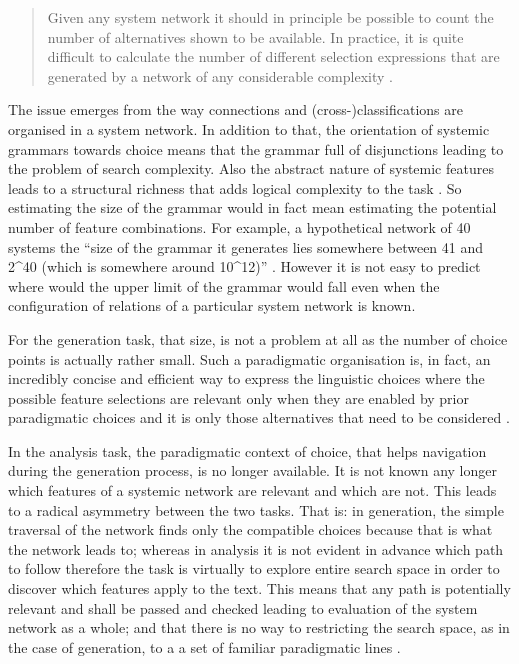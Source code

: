 \begin{quotation}
    Given any system network it should in principle be possible to count the number of alternatives shown to be available. In practice, it is quite difficult to calculate the number of different selection expressions that are generated by a network of any considerable complexity \citep[10]{Halliday96-grammatics}.
\end{quotation}

The issue emerges from the way connections and (cross-)classifications are organised in a system network. In addition to that, the orientation of systemic grammars towards choice means that the grammar full of disjunctions leading to the problem of search complexity. Also the abstract nature of systemic features leads to a structural richness that adds logical complexity to the task \citep{ODonnell1993}. So estimating the size of the grammar would in fact mean estimating the potential number of feature combinations. For example, a hypothetical network of 40 systems the ``size of the grammar it generates lies somewhere between 41 and 2^{40} (which is somewhere around 10^{12})'' \citep[28]{Bateman2008}. However it is not easy to predict where would the upper limit of the grammar would fall even when the configuration of relations of a particular system network is known.

For the generation task, that size, is not a problem at all as the number of choice points is actually rather small. Such a paradigmatic organisation is, in fact, an incredibly concise and efficient way to express the linguistic choices where the possible feature selections are relevant only when they are enabled by prior paradigmatic choices and it is only those alternatives that need to be considered \citep[12--13]{Halliday96-grammatics} .

In the analysis task, the paradigmatic context of choice, that helps navigation during the generation process, is no longer available. It is not known
any longer which features of a systemic network are relevant and which are not. This leads to a radical asymmetry between the two tasks. That
is: in generation, the simple traversal of the network finds only the compatible choices
because that is what the network leads to; whereas in analysis it is not evident in
advance which path to follow therefore the task is virtually to explore entire search
space in order to discover which features apply to the text. This means that any path is potentially relevant and shall be passed and checked leading to evaluation of the system network as a whole; and that there is no way to restricting the search space, as in the case of generation, to a a set of familiar paradigmatic lines \citep[29]{Bateman2008}. 

